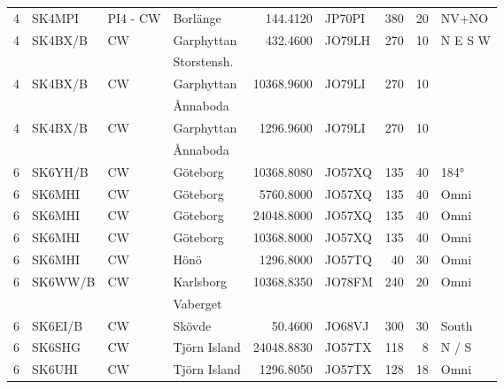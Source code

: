 \begin{longtable}{rlllrlrrl}
4        & SK4MPI     & PI4 - CW & Borlänge     & 144.4120     & JP70PI      & 380      & 20       & NV+NO        \\
4        & SK4BX/B    & CW       & Garphyttan   & 432.4600     & JO79LH      & 270      & 10       & N E S W      \\
         &            &          & Storstensh.  &              &             &          &          &              \\
4        & SK4BX/B    & CW       & Garphyttan   & 10368.9600   & JO79LI      & 270      & 10       &              \\
         &            &          & Ånnaboda     &              &             &          &          &              \\
4        & SK4BX/B    & CW       & Garphyttan   & 1296.9600    & JO79LI      & 270      & 10       &              \\
         &            &          & Ånnaboda     &              &             &          &          &              \\
6        & SK6YH/B    & CW       & Göteborg     & 10368.8080   & JO57XQ      & 135      & 40       & 184°         \\
6        & SK6MHI     & CW       & Göteborg     & 5760.8000    & JO57XQ      & 135      & 40       & Omni         \\
6        & SK6MHI     & CW       & Göteborg     & 24048.8000   & JO57XQ      & 135      & 40       & Omni         \\
6        & SK6MHI     & CW       & Göteborg     & 10368.8000   & JO57XQ      & 135      & 40       & Omni         \\
6        & SK6MHI     & CW       & Hönö         & 1296.8000    & JO57TQ      & 40       & 30       & Omni         \\
6        & SK6WW/B    & CW       & Karlsborg    & 10368.8350   & JO78FM      & 240      & 20       & Omni         \\
         &            &          & Vaberget     &              &             &          &          &              \\
6        & SK6EI/B    & CW       & Skövde       & 50.4600      & JO68VJ      & 300      & 30       & South        \\
6        & SK6SHG     & CW       & Tjörn Island & 24048.8830   & JO57TX      & 118      & 8        & N / S        \\
6        & SK6UHI     & CW       & Tjörn Island & 1296.8050    & JO57TX      & 128      & 18       & Omni         \\

\end{longtable}
